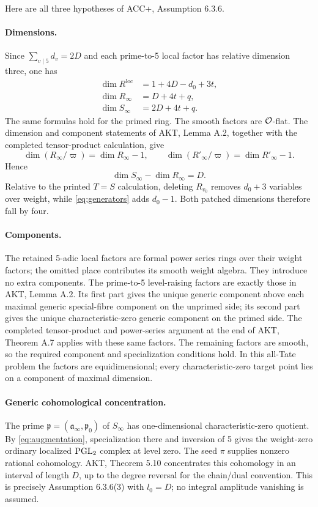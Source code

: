 \documentclass[11pt,a4paper]{article}
\theoremstyle{definition}\newtheorem{definition}[theorem]{Definition}
\theoremstyle{remark}\newtheorem*{remark}{Remark}
\begin{document}
Here are all three hypotheses of ACC+, Assumption 6.3.6.

\paragraph{Dimensions.}
Since $\sum_{v\mid5}d_v=2D$ and each prime-to-5 local factor has relative
dimension three, one has
\begin{align*}
\dim R^{\mathrm{loc}}&=1+4D-d_0+3t,\\
\dim R_\infty&=D+4t+q,\\
\dim S_\infty&=2D+4t+q.
\end{align*}
The same formulas hold for the primed ring. The smooth factors are
$\mathcal O$-flat. The dimension and component statements of AKT, Lemma A.2,
together with the completed tensor-product calculation, give
\[
\dim(R_\infty/\varpi)=\dim R_\infty-1,\qquad
\dim(R'_\infty/\varpi)=\dim R'_\infty-1.
\]
Hence
\begin{equation}\label{eq:defect}
\dim S_\infty-\dim R_\infty=D.
\end{equation}
Relative to the printed $T=S$ calculation, deleting $R_{v_0}$ removes
$d_0+3$ variables over weight, while \eqref{eq:generators} adds $d_0-1$.
Both patched dimensions therefore fall by four.

\paragraph{Components.}
The retained 5-adic local factors are formal power series rings over their
weight factors; the omitted place contributes its smooth weight algebra.
They introduce no extra components. The prime-to-5 level-raising factors
are exactly those in AKT, Lemma A.2. Its first part gives the unique generic
component above each maximal generic special-fibre component on the
unprimed side; its second part gives the unique characteristic-zero generic
component on the primed side. The completed tensor-product and power-series
argument at the end of AKT, Theorem A.7 applies with these same factors.
The remaining factors are smooth, so the required component and
specialization conditions hold. In this all-Tate problem the factors are
equidimensional; every characteristic-zero target point lies on a component
of maximal dimension.

\paragraph{Generic cohomological concentration.}
The prime $\mathfrak p=(\mathfrak a_\infty,\mathfrak p_0)$ of $S_\infty$
has one-dimensional characteristic-zero quotient. By \eqref{eq:augmentation},
specialization there and inversion of 5 gives the weight-zero ordinary
localized $\operatorname{PGL}_2$ complex at level zero. The seed $\pi$ supplies nonzero
rational cohomology. AKT, Theorem 5.10 concentrates this cohomology in an
interval of length $D$, up to the degree reversal for the chain/dual convention.
This is precisely Assumption 6.3.6(3) with $l_0=D$; no integral amplitude
vanishing is assumed.
\end{document}
